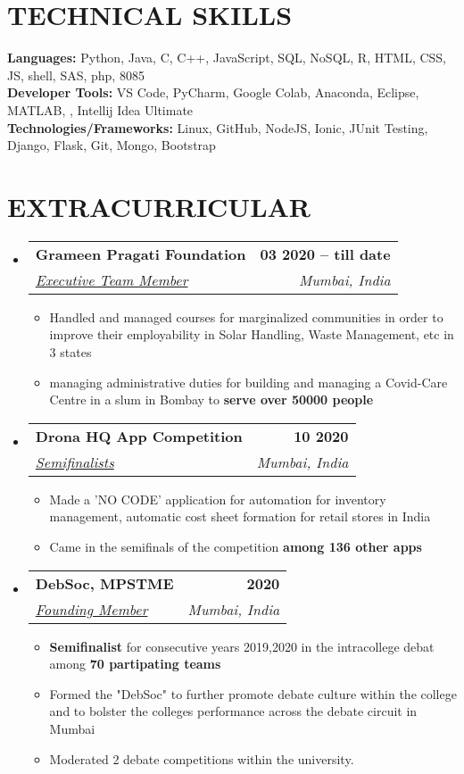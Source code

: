 \documentclass[letterpaper,11pt]{article}
\makeatletter
\newcommand{\resumeItem}[1]{
  \item\small{
    {#1 \vspace{-2pt}}
  }
}
\newcommand{\resumeSubheading}[4]{
  \vspace{-2pt}\item
    \begin{tabular*}{1.0\textwidth}[t]{l@{\extracolsep{\fill}}r}
      \textbf{\large#1} & \textbf{\small #2} \\
      \textit{\large#3} & \textit{\small #4} \\
      
    \end{tabular*}\vspace{-7pt}
}
\newcommand{\resumeSubHeadingListStart}{\begin{itemize}[leftmargin=0.0in, label={}]}
\newcommand{\resumeSubHeadingListEnd}{\end{itemize}}
\newcommand{\resumeItemListStart}{\begin{itemize}}
\newcommand{\resumeItemListEnd}{\end{itemize}\vspace{-5pt}}
\makeatother
\begin{document}
\section{TECHNICAL SKILLS}
 \begin{itemize}[leftmargin=0.15in, label={}]
    \small{\item{
     \textbf{\normalsize{Languages:}}{ \normalsize{Python, Java, C, C++, JavaScript, SQL, NoSQL, R, HTML, CSS, JS, shell, SAS, php, 8085}} \\
     \textbf{\normalsize{Developer Tools:}}{ \normalsize{VS Code, PyCharm, Google Colab, Anaconda, Eclipse, MATLAB, , Intellij Idea Ultimate}} \\
     \textbf{\normalsize{Technologies/Frameworks:}}{\normalsize{ Linux, GitHub, NodeJS, Ionic, JUnit Testing, Django, Flask, Git, Mongo, Bootstrap}} \\
    }}
 \end{itemize}
 \vspace{-15pt}


\section{EXTRACURRICULAR}
    \resumeSubHeadingListStart
        \resumeSubheading{Grameen Pragati Foundation \href{https://grameenpragati.com}{\raisebox{-0.1\height}\faExternalLink } }{03 2020 -- till date}{\underline{Executive Team Member}}{Mumbai, India}
            \resumeItemListStart
                \resumeItem{\normalsize{Handled and managed courses for marginalized communities in order to improve their employability in Solar Handling, Waste Management, etc in 3 states}}
               \resumeItem{\normalsize{managing administrative duties for building and managing a Covid-Care Centre in a slum in Bombay to \textbf{serve over 50000 people}}}
            \resumeItemListEnd
            

        \resumeSubheading{Drona HQ App Competition \href{https://www.dronahq.com}{\raisebox{-0.1\height}\faExternalLink } }{10 2020}{\underline{Semifinalists}}{Mumbai, India}
            \resumeItemListStart
                \resumeItem{\normalsize{Made a 'NO CODE' application for automation for inventory management, automatic cost sheet formation for retail stores in India}}
               \resumeItem{\normalsize{Came in the semifinals of the competition \textbf{among 136 other apps}}}
            \resumeItemListEnd
        
        \resumeSubheading{DebSoc, MPSTME}{2020}{\underline{Founding Member}}{Mumbai, India}
            \resumeItemListStart
                \resumeItem{\normalsize{\textbf{Semifinalist} for consecutive years 2019,2020 in the intracollege debat among \textbf{70 partipating teams}}}
               \resumeItem{\normalsize{Formed the "DebSoc" to further promote debate culture within the college and to bolster the colleges performance across the debate circuit in Mumbai}}
               \resumeItem{\normalsize{Moderated 2 debate competitions within the university.}}
            \resumeItemListEnd
    \resumeSubHeadingListEnd
 \vspace{-11pt}
 
\end{document}
